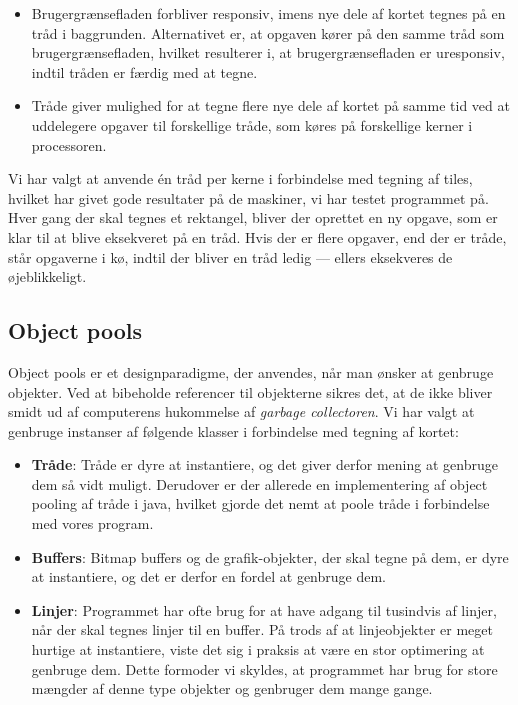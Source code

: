 \begin{itemize}
	\item Brugergrænsefladen forbliver responsiv, imens nye dele af kortet tegnes på en tråd i baggrunden. Alternativet er, at opgaven kører på den samme tråd som brugergrænsefladen, hvilket resulterer i, at brugergrænsefladen er uresponsiv, indtil tråden er færdig med at tegne.
	\item Tråde giver mulighed for at tegne flere nye dele af kortet på samme tid ved at uddelegere opgaver til forskellige tråde, som køres på forskellige kerner i processoren.
\end{itemize}

Vi har valgt at anvende én tråd per kerne i forbindelse med tegning af tiles, hvilket har givet gode resultater på de maskiner, vi har testet programmet på. Hver gang der skal tegnes et rektangel, bliver der oprettet en ny opgave, som er klar til at blive eksekveret på en tråd. Hvis der er flere opgaver, end der er tråde, står opgaverne i kø, indtil der bliver en tråd ledig --- ellers eksekveres de øjeblikkeligt.

\subsection{Object pools}
\label{subsec:objectPools}

Object pools er et designparadigme, der anvendes, når man ønsker at genbruge objekter. Ved at bibeholde referencer til objekterne sikres det, at de ikke bliver smidt ud af computerens hukommelse af \emph{garbage collectoren}. Vi har valgt at genbruge instanser af følgende klasser i forbindelse med tegning af kortet:

\begin{itemize}
	\item \textbf{Tråde}: Tråde er dyre at instantiere, og det giver derfor mening at genbruge dem så vidt muligt. Derudover er der allerede en implementering af object pooling af tråde i java, hvilket gjorde det nemt at poole tråde i forbindelse med vores program.
	\item \textbf{Buffers}: Bitmap buffers og de grafik-objekter, der skal tegne på dem, er dyre at instantiere, og det er derfor en fordel at genbruge dem.
	\item \textbf{Linjer}: Programmet har ofte brug for at have adgang til tusindvis af linjer, når der skal tegnes linjer til en buffer. På trods af at linjeobjekter er meget hurtige at instantiere, viste det sig i praksis at være en stor optimering at genbruge dem. Dette formoder vi skyldes, at programmet har brug for store mængder af denne type objekter og genbruger dem mange gange.
\end{itemize}

